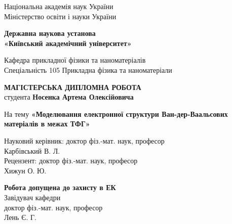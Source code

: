 \begin{titlepage}
 \begin{center}
Національна академія наук України \\
Міністерство освіти і науки України
  \vspace{0.25cm}
  
  \textbf{Державна наукова установа \\ 
  «Київський академічний університет»}
  \vspace{0.5cm}
  
  Кафедра прикладної фізики та наноматеріалів
  \\ Спеціальність 105 Прикладна фізика та наноматеріали
  
  \vspace{1cm}
  
  \large\textbf{МАГІСТЕРСЬКА  ДИПЛОМНА  РОБОТА} \\
  студента  \textbf{Носенка Артема Олексійовича}
 \end{center}
\begin{center}
 {На тему \large\textbf{«Моделювання електронної структури Ван-дер-Ваальсових матеріалів в межах ТФГ»}\par}
\end{center}
\vspace{0.5cm}

\hfill\parbox{12cm}{
\begin{flushleft}
 \hfill Науковий керівник: доктор фіз.-мат. наук, професор \\
 \hfill \underline{\hspace{4cm}} \hspace{1cm} Карбівський В. Л. \\
 \hfill Рецензент: доктор фіз.-мат. наук, професор \\
 \hfill \underline{\hspace{4cm}} \hspace{2cm} Хижун О. Ю. \\
\end{flushleft}}

\hfill\parbox{10cm}{
\begin{flushleft}
 \begin{center}
 \small
     \textbf{Робота допущена до захисту в ЕК} \\
     Завідувач кафедри \\
     доктор фіз.-мат. наук, професор \\
     \hfill \underline{\hspace{4cm}} \hspace{1cm} Лень Є. Г.  
 \end{center}
\end{flushleft}}


\end{titlepage}
